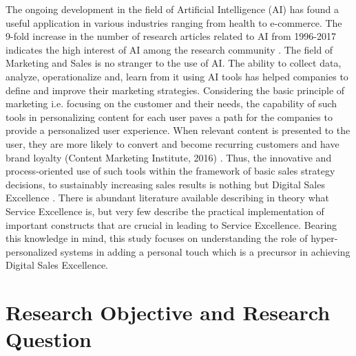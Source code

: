The ongoing development in the field of Artificial Intelligence (AI) has found a useful application in various industries ranging from health to e-commerce. The 9-fold increase in the number of research articles related to AI from 1996-2017 indicates the high interest of AI among the research community \autocite[9]{Shoham2018}. The field of Marketing and Sales is no stranger to the use of AI. The ability to collect data, analyze, operationalize and, learn from it using AI tools has helped companies to define and improve their marketing strategies. Considering the basic principle of marketing i.e. focusing on the customer and their needs, the capability of such tools in personalizing content for each user paves a path for the companies to provide a personalized user experience. When relevant content is presented to the user, they are more likely to convert and become recurring customers and have brand loyalty \autocite{content} (Content Marketing Institute, 2016) . Thus, the innovative and process-oriented use of such tools within the framework of basic sales strategy decisions, to sustainably increasing sales results is nothing but Digital Sales Excellence \autocite[5]{Binckebanck2016}.
There is abundant literature available describing in theory what Service Excellence is, but very few describe the practical implementation of important constructs that are crucial in leading to Service Excellence\autocite[131]{Johnston2004}. Bearing this knowledge in mind, this study focuses on understanding the role of hyper-personalized systems in adding a personal touch which is a precursor in achieving Digital Sales Excellence. 




\section{Research Objective and Research Question}

